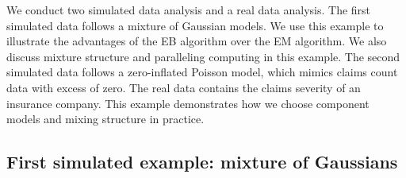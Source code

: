 \documentclass[11pt]{article}
\numberwithin{equation}{section}
\begin{document}
We conduct two simulated data analysis and a real data analysis. 
The first simulated data follows a mixture of Gaussian models. 
We use this example to illustrate the advantages of the EB algorithm over the EM algorithm.
We also discuss mixture structure and paralleling computing in this example.
The second simulated data follows a zero-inflated Poisson model, which mimics claims count data with excess of zero.
The real data contains the claims severity of an insurance company. This example demonstrates how we choose component models and mixing structure in practice.



\subsection{First simulated example: mixture of Gaussians}
\end{document}
